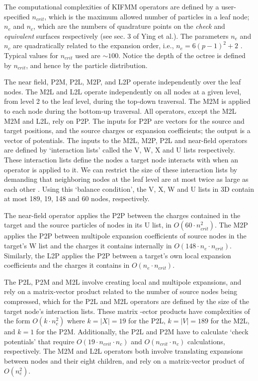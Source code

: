 \documentclass{IEEEcsmag}
\begin{document}
The computational complexities of KIFMM operators are defined by a user-specified $n_{crit}$, which is the maximum allowed number of particles in a leaf node; $n_e$ and $n_c$, which are the numbers of quadrature points on the \textit{check} and \textit{equivalent} surfaces respectively (see sec. 3 of Ying et al.\cite{Ying2004}). The parameters $n_e$ and $n_c$ are quadratically related to the expansion order, i.e., $n_e = 6(p-1)^2 + 2$ \cite{Ying2004}. Typical values for $n_{crit}$ used are $\sim 100$. Notice the depth of the octree is defined by $n_{crit}$, and hence by the particle distribution.

The near field, P2M, P2L, M2P, and L2P operate independently over the leaf nodes. The M2L and L2L operate independently on all nodes at a given level, from level 2 to the leaf level, during the top-down traversal. The M2M is applied to each node during the bottom-up traversal.
All operators, except the M2L M2M and L2L, rely on P2P. The inputs for P2P are vectors for the source and target positions, and the source charges or expansion coefficients; the output is a vector of potentials.
The inputs to the M2L, M2P, P2L and near-field operators are defined by `interaction lists' called the V, W, X and U lists respectively. These interaction lists define the nodes a target node interacts with when an operator is applied to it. We can restrict the size of these interaction lists by demanding that neighboring nodes at the leaf level are at most twice as large as each other \cite{Sundar2007}. Using this `balance condition', the V, X, W and U lists in 3D contain at most 189, 19, 148 and 60 nodes, respectively.

The near-field operator applies the P2P between the charges contained in the target and the source particles of nodes in its U list, in $O(60 \cdot n_{crit}^2)$. The M2P applies the P2P between multipole expansion coefficients of source nodes in the target's W list and the charges it contains internally in $O(148 \cdot n_e \cdot n_{crit})$. Similarly, the L2P applies the P2P between a target's own local expansion coefficients and the charges it contains in $O(n_e \cdot n_{crit})$.

The P2L, P2M and M2L involve creating local and multipole expansions, and rely on a matrix-vector product related to the number of source nodes being compressed, which for the P2L and M2L operators are defined by the size of the target node's interaction lists. These matrix -ector products have complexities of the form $O(k \cdot n_e^2)$ where $k = |X| = 19$ for the P2L, $k = |V| = 189$ for the M2L, and $k = 1$ for the P2M. Additionally, the P2L and P2M have to calculate `check potentials' \cite{Ying2004} that require $O(19 \cdot n_{crit} \cdot n_c)$ and $O(n_{crit} \cdot n_c)$ calculations, respectively. The M2M and L2L operators both involve translating expansions between nodes and their eight children, and rely on a matrix-vector product of $O(n_e^2)$.
\end{document}
